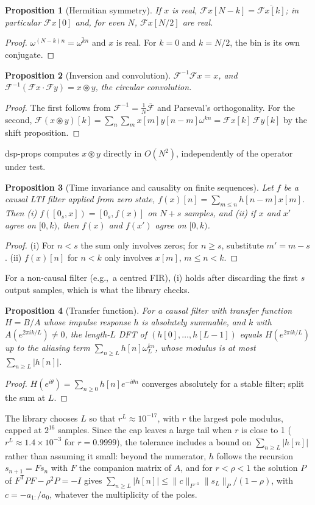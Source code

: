 \documentclass[10pt,conference]{IEEEtran}
\newtheorem{proposition}{Proposition}
\newcommand{\DFT}{\mathcal{F}}
\newcommand{\eg}{e.g.,\ }
\begin{document}
\begin{proposition}[Hermitian symmetry] If $x$ is real, $\DFT x[N-k]=\overline{\DFT x[k]}$;
in particular $\DFT x[0]$ and, for even $N$, $\DFT x[N/2]$ are real.\end{proposition}
\begin{proof} $\omega^{(N-k)n}=\overline{\omega^{kn}}$ and $x$ is real. For
$k=0$ and $k=N/2$, the bin is its own conjugate.\end{proof}

\begin{proposition}[Inversion and convolution] $\DFT^{-1}\DFT x=x$, and
$\DFT^{-1}(\DFT x\cdot\DFT y)=x\circledast y$, the circular convolution.\end{proposition}
\begin{proof} The first follows from $\DFT^{-1}=\frac1N\overline{\DFT}$ and
Parseval's orthogonality. For the second, $\DFT(x\circledast y)[k]
=\sum_n\sum_m x[m]y[n-m]\omega^{kn}=\DFT x[k]\,\DFT y[k]$ by the shift
proposition.\end{proof}
dsp-props computes $x\circledast y$ directly in $O(N^2)$, independently of
the operator under test.

\begin{proposition}[Time invariance and causality on finite sequences] Let
$f$ be a causal LTI filter applied from zero state, $f(x)[n]=\sum_{m\le n}h[n-m]x[m]$.
Then (i) $f([0_s,x])=[0_s,f(x)]$ on $N+s$ samples, and (ii) if $x$ and $x'$
agree on $[0,k)$, then $f(x)$ and $f(x')$ agree on $[0,k)$.\end{proposition}
\begin{proof} (i) For $n<s$ the sum only involves zeros; for $n\ge s$,
substitute $m'=m-s$. (ii) $f(x)[n]$ for $n<k$ only involves $x[m]$, $m\le n<k$.
\end{proof}
For a non-causal filter (\eg a centred FIR), (i) holds after discarding the
first $s$ output samples, which is what the library checks.

\begin{proposition}[Transfer function] For a causal filter with
transfer function $H=B/A$ whose impulse response $h$ is absolutely summable,
and $k$ with $A(e^{2\pi ik/L})\neq0$, the length-$L$ DFT of
$(h[0],\dots,h[L-1])$ equals $H(e^{2\pi i k/L})$ up to the aliasing term
$\sum_{n\ge L}h[n]\omega_L^{kn}$, whose modulus is at most $\sum_{n\ge L}|h[n]|$.
\end{proposition}
\begin{proof} $H(e^{i\theta})=\sum_{n\ge0}h[n]e^{-i\theta n}$ converges
absolutely for a stable filter; split the sum at $L$.\end{proof}
The library chooses $L$ so that $r^L\approx10^{-17}$, with $r$ the largest
pole modulus, capped at $2^{16}$ samples. Since the cap leaves a large tail when
$r$ is close to 1 ($r^{L}\approx1.4\times10^{-3}$ for $r=0.9999$), the
tolerance includes a bound on $\sum_{n\ge L}|h[n]|$ rather than assuming it
small: beyond the numerator, $h$ follows the recursion $s_{n+1}=Fs_n$ with $F$
the companion matrix of $A$, and for $r<\rho<1$ the solution $P$ of
$F^{\mathsf T}PF-\rho^2P=-I$ gives
$\sum_{n\ge L}|h[n]|\le\|c\|_{P^{-1}}\|s_L\|_P/(1-\rho)$, with
$c=-a_{1:}/a_0$, whatever the multiplicity of the poles.
\end{document}
